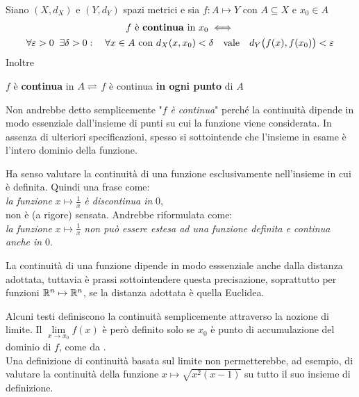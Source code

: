 \begin{definition}
	\label{def:funz_cont}
	Siano $(X,d_X)$ e $(Y,d_Y)$ spazi metrici e sia $f: A \mapsto Y$ con $A \subseteq X$ e $x_0 \in A$
	\begin{equation*}
		\begin{gathered}
			f \text{ è \textbf{continua} in } x_0 \iff\\
			\forall \varepsilon > 0\;\;\exists \delta > 0:\quad \forall x \in A \text{ con } d_X(x,x_0)<\delta \quad \text{vale} \quad d_Y \bigl(f(x),f(x_0)\bigr) < \varepsilon
		\end{gathered}
	\end{equation*}
	Inoltre
	\begin{center}
		$f$ è \textbf{continua} in $A\rightleftharpoons$ $f$ è continua \textbf{in ogni punto} di $A$
	\end{center}
	\begin{note}
		Non andrebbe detto semplicemente "$f$ \textit{è continua}" perché la continuità dipende in modo essenziale dall'insieme di punti su cui la funzione viene considerata. In assenza di ulteriori specificazioni, spesso si sottointende che l'insieme in esame è l'intero dominio della funzione.
	\end{note}
	\begin{note}
		Ha senso valutare la continuità di una funzione esclusivamente nell'insieme in cui è definita. Quindi una frase come:\\
		\textit{la funzione} $x \mapsto \frac{1}{x}$ \textit{è discontinua in} $0$,\\
		non è (a rigore) sensata. Andrebbe riformulata come:\\
		\textit{la funzione} $x \mapsto \frac{1}{x}$ \textit{non può essere estesa ad una funzione definita e continua anche in} $0$.
	\end{note}
	\begin{note}
		La continuità di una funzione dipende in modo esssenziale anche dalla distanza adottata, tuttavia è prassi sottointendere questa precisazione, soprattutto per funzioni $\mathbb{R}^n \mapsto \mathbb{R}^n$, se la distanza adottata è quella Euclidea.
	\end{note}
\end{definition}
\begin{observation}
	Alcuni testi definiscono la continuità semplicemente attraverso la nozione di limite. Il $\lim\limits_{x \to x_0} f(x)$ è però definito solo se $x_0$ è punto di accumulazione del dominio di $f$, come da .\\
	Una definizione di continuità basata sul limite non permetterebbe, ad esempio, di valutare la continuità della funzione $x \mapsto \sqrt{x^2(x-1)}$ su tutto il suo insieme di definizione.
\end{observation}
